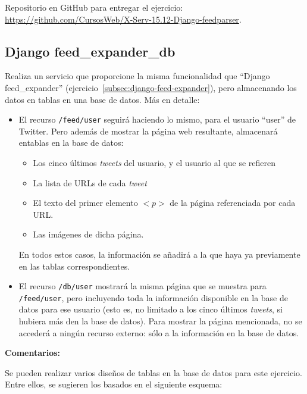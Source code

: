 Repositorio en GitHub para entregar el ejercicio: \\ 
\url{https://github.com/CursosWeb/X-Serv-15.12-Django-feedparser}.


\subsection{Django feed\_expander\_db}
\label{subsec:django-feed-expander-db}

Realiza un servicio que proporcione la misma funcionalidad que ``Django feed\_expander'' (ejercicio~\ref{subsec:django-feed-expander}), pero almacenando los datos en tablas en una base de datos. Más en detalle:

\begin{itemize}
\item El recurso \verb|/feed/user| seguirá haciendo lo mismo, para el usuario ``user'' de Twitter. Pero además de mostrar la página web resultante, almacenará entablas en la base de datos:

  \begin{itemize}
  \item Los cinco últimos \emph{tweets} del usuario, y el usuario al que se refieren
  \item La lista de URLs de cada \emph{tweet}
  \item El texto del primer elemento $<p>$ de la página referenciada por cada URL.
  \item Las imágenes de dicha página.
  \end{itemize}

En todos estos casos, la información se añadirá a la que haya ya previamente en las tablas correspondientes.

\item El recurso \verb|/db/user| mostrará la misma página que se muestra para \verb|/feed/user|, pero incluyendo toda la información disponible en la base de datos para ese usuario (esto es, no limitado a los cinco últimos \emph{tweets}, si hubiera más den la base de datos). Para mostrar la página mencionada, no se accederá a ningún recurso externo: sólo a la información en la base de datos.
\end{itemize}

\textbf{Comentarios:}

Se pueden realizar varios diseños de tablas en la base de datos para este ejercicio. Entre ellos, se sugieren los basados en el siguiente esquema:

